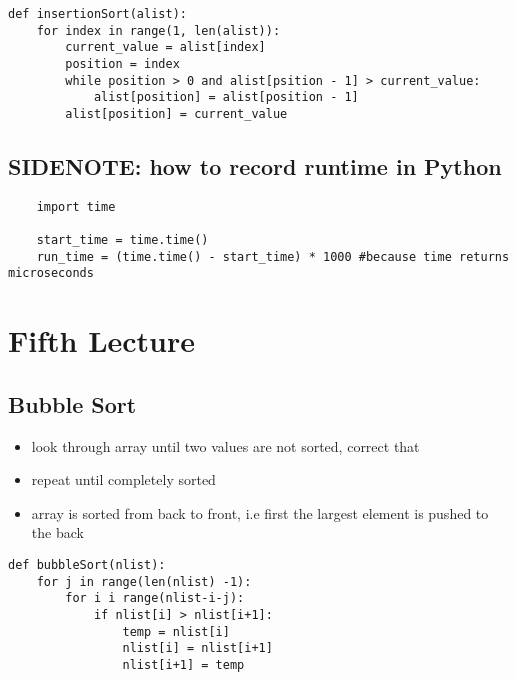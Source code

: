 \documentclass[a4paper]{article}
\begin{document}
\begin{lstlisting}
def insertionSort(alist):
    for index in range(1, len(alist)):
        current_value = alist[index]
        position = index
        while position > 0 and alist[psition - 1] > current_value:
            alist[position] = alist[position - 1]
        alist[position] = current_value
\end{lstlisting}

\subsection{SIDENOTE: how to record runtime in Python}
\begin{lstlisting}
    import time

    start_time = time.time()
    run_time = (time.time() - start_time) * 1000 #because time returns microseconds
\end{lstlisting}

\section{Fifth Lecture}

\subsection{Bubble Sort}

\begin{itemize}
    \item look through array until two values are not sorted, correct that
    \item repeat until completely sorted
    \item array is sorted from back to front, i.e first the largest element is pushed to the back
\end{itemize}


\begin{lstlisting}
def bubbleSort(nlist):
    for j in range(len(nlist) -1):
        for i i range(nlist-i-j):
            if nlist[i] > nlist[i+1]:
                temp = nlist[i]
                nlist[i] = nlist[i+1]
                nlist[i+1] = temp
\end{lstlisting}
\end{document}
